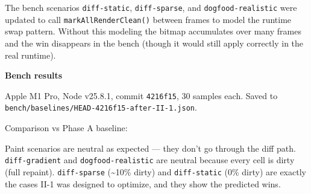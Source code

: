 The bench scenarios \texttt{d\allowbreak{}i\allowbreak{}f\allowbreak{}f\allowbreak{}-\allowbreak{}s\allowbreak{}t\allowbreak{}a\allowbreak{}t\allowbreak{}i\allowbreak{}c}, \texttt{d\allowbreak{}i\allowbreak{}f\allowbreak{}f\allowbreak{}-\allowbreak{}s\allowbreak{}p\allowbreak{}a\allowbreak{}r\allowbreak{}s\allowbreak{}e}, and \texttt{d\allowbreak{}o\allowbreak{}g\allowbreak{}f\allowbreak{}o\allowbreak{}o\allowbreak{}d\allowbreak{}-\allowbreak{}r\allowbreak{}e\allowbreak{}a\allowbreak{}l\allowbreak{}i\allowbreak{}s\allowbreak{}t\allowbreak{}i\allowbreak{}c} were updated to call \texttt{m\allowbreak{}a\allowbreak{}r\allowbreak{}k\allowbreak{}A\allowbreak{}l\allowbreak{}l\allowbreak{}R\allowbreak{}e\allowbreak{}n\allowbreak{}d\allowbreak{}e\allowbreak{}r\allowbreak{}C\allowbreak{}l\allowbreak{}e\allowbreak{}a\allowbreak{}n\allowbreak{}(\allowbreak{})} between frames to model the runtime swap pattern. Without this modeling the bitmap accumulates over many frames and the win disappears in the bench (though it would still apply correctly in the real runtime).

\textbf{Bench results}

Apple M1 Pro, Node v25.8.1, commit \texttt{4\allowbreak{}2\allowbreak{}1\allowbreak{}6\allowbreak{}f\allowbreak{}1\allowbreak{}5}, 30 samples each. Saved to \texttt{b\allowbreak{}e\allowbreak{}n\allowbreak{}c\allowbreak{}h\allowbreak{}/\allowbreak{}b\allowbreak{}a\allowbreak{}s\allowbreak{}e\allowbreak{}l\allowbreak{}i\allowbreak{}n\allowbreak{}e\allowbreak{}s\allowbreak{}/\allowbreak{}H\allowbreak{}E\allowbreak{}A\allowbreak{}D\allowbreak{}-\allowbreak{}4\allowbreak{}2\allowbreak{}1\allowbreak{}6\allowbreak{}f\allowbreak{}1\allowbreak{}5\allowbreak{}-\allowbreak{}a\allowbreak{}f\allowbreak{}t\allowbreak{}e\allowbreak{}r\allowbreak{}-\allowbreak{}I\allowbreak{}I\allowbreak{}-\allowbreak{}1\allowbreak{}.\allowbreak{}j\allowbreak{}s\allowbreak{}o\allowbreak{}n}.

Comparison vs Phase A baseline:



Paint scenarios are neutral as expected --- they don't go through the diff path. \texttt{d\allowbreak{}i\allowbreak{}f\allowbreak{}f\allowbreak{}-\allowbreak{}g\allowbreak{}r\allowbreak{}a\allowbreak{}d\allowbreak{}i\allowbreak{}e\allowbreak{}n\allowbreak{}t} and \texttt{d\allowbreak{}o\allowbreak{}g\allowbreak{}f\allowbreak{}o\allowbreak{}o\allowbreak{}d\allowbreak{}-\allowbreak{}r\allowbreak{}e\allowbreak{}a\allowbreak{}l\allowbreak{}i\allowbreak{}s\allowbreak{}t\allowbreak{}i\allowbreak{}c} are neutral because every cell is dirty (full repaint). \texttt{d\allowbreak{}i\allowbreak{}f\allowbreak{}f\allowbreak{}-\allowbreak{}s\allowbreak{}p\allowbreak{}a\allowbreak{}r\allowbreak{}s\allowbreak{}e} (\textasciitilde10\% dirty) and \texttt{d\allowbreak{}i\allowbreak{}f\allowbreak{}f\allowbreak{}-\allowbreak{}s\allowbreak{}t\allowbreak{}a\allowbreak{}t\allowbreak{}i\allowbreak{}c} (0\% dirty) are exactly the cases II-1 was designed to optimize, and they show the predicted wins.

